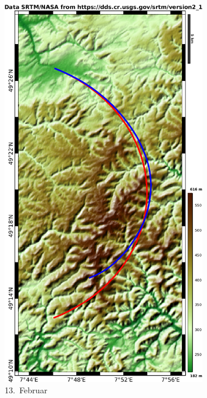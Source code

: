 \documentclass[
    paper=a4,
    DIV14,
    fontsize=12pt,
    pagesize=pdftex,
    toc=bibliographynumbered
]{scrartcl}
\numberwithin{figure}{section}
\numberwithin{equation}{section}
\numberwithin{table}{section}
\begin{document}
\begin{figure}[hbt]
    \centering
    \begin{subfigure}{0.31\textwidth}
        \centering
        \includegraphics[width=0.98\textwidth]{images/elediff/feb13.png}
        \caption{13.\ Februar}
    \end{subfigure}
    \begin{subfigure}{0.67\textwidth}

\end{subfigure}
\end{figure}
\end{document}
